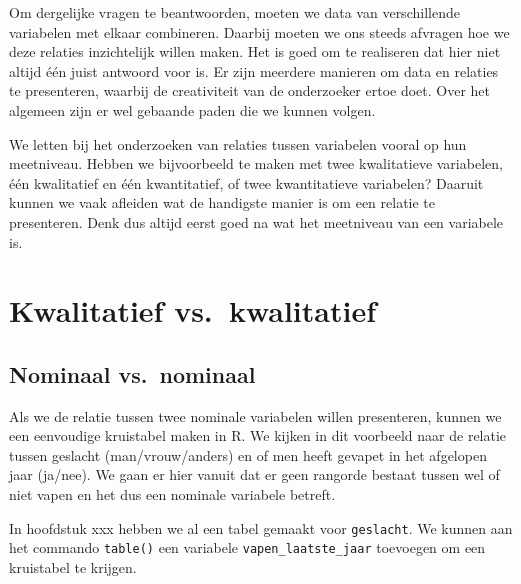 \documentclass[
  letterpaper,
  DIV=11,
  numbers=noendperiod]{scrreprt}
\newenvironment{Shaded}{\begin{snugshade}}{\end{snugshade}}
\newcommand{\CommentTok}[1]{\textcolor[rgb]{0.37,0.37,0.37}{#1}}
\newcommand{\FunctionTok}[1]{\textcolor[rgb]{0.28,0.35,0.67}{#1}}
\newcommand{\NormalTok}[1]{\textcolor[rgb]{0.00,0.23,0.31}{#1}}
\newcommand{\SpecialCharTok}[1]{\textcolor[rgb]{0.37,0.37,0.37}{#1}}
\begin{document}
Om dergelijke vragen te beantwoorden, moeten we data van verschillende
variabelen met elkaar combineren. Daarbij moeten we ons steeds afvragen
hoe we deze relaties inzichtelijk willen maken. Het is goed om te
realiseren dat hier niet altijd één juist antwoord voor is. Er zijn
meerdere manieren om data en relaties te presenteren, waarbij de
creativiteit van de onderzoeker ertoe doet. Over het algemeen zijn er
wel gebaande paden die we kunnen volgen.

We letten bij het onderzoeken van relaties tussen variabelen vooral op
hun meetniveau. Hebben we bijvoorbeeld te maken met twee kwalitatieve
variabelen, één kwalitatief en één kwantitatief, of twee kwantitatieve
variabelen? Daaruit kunnen we vaak afleiden wat de handigste manier is
om een relatie te presenteren. Denk dus altijd eerst goed na wat het
meetniveau van een variabele is.

\section{Kwalitatief vs.~kwalitatief}\label{kwalitatief-vs.-kwalitatief}

\subsection{Nominaal vs.~nominaal}\label{nominaal-vs.-nominaal}

Als we de relatie tussen twee nominale variabelen willen presenteren,
kunnen we een eenvoudige kruistabel maken in R. We kijken in dit
voorbeeld naar de relatie tussen geslacht (man/vrouw/anders) en of men
heeft gevapet in het afgelopen jaar (ja/nee). We gaan er hier vanuit dat
er geen rangorde bestaat tussen wel of niet vapen en het dus een
nominale variabele betreft.

In hoofdstuk xxx hebben we al een tabel gemaakt voor \texttt{geslacht}.
We kunnen aan het commando \texttt{table()} een variabele
\texttt{vapen\_laatste\_jaar} toevoegen om een kruistabel te krijgen.

\begin{Shaded}
\end{Shaded}
\end{document}
